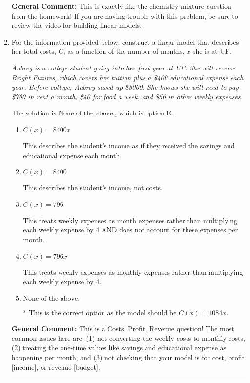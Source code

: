 \documentclass{extbook}[14pt]
\newcommand{\litem}[1]{\item #1

\rule{\textwidth}{0.4pt}}
\begin{document}
\begin{enumerate}
{\textbf{General Comment:} This is exactly like the chemistry mixture question from the homework! If you are having trouble with this problem, be sure to review the video for building linear models.
}
\litem{
For the information provided below, construct a linear model that describes her total costs, $C$, as a function of the number of months, $x$ she is at UF. 

\begin{center}
    \textit{ Aubrey is a college student going into her first year at UF. She will receive Bright Futures, which covers her tuition plus a \$400 educational expense each year. Before college, Aubrey saved up \$8000. She knows she will need to pay \$700 in rent a month, \$40 for food a week, and \$56 in other weekly expenses. }
\end{center}
The solution is \( \text{None of the above.} \), which is option E.\begin{enumerate}[label=\Alph*.]
\item \( C(x) = 8400 x \)

This describes the student's income as if they received the savings and educational expense each month.
\item \( C(x) = 8400 \)

This describes the student's income, not costs.
\item \( C(x) = 796 \)

This treats weekly expenses as month expenses rather than multiplying each weekly expense by 4 AND does not account for these expenses per month.
\item \( C(x) = 796 x \)

This treats weekly expenses as monthly expenses rather than multiplying each weekly expense by 4.
\item \( \text{None of the above.} \)

* This is the correct option as the model should be $C(x) = 1084 x$.
\end{enumerate}

\textbf{General Comment:} This is a Costs, Profit, Revenue question! The most common issues here are: (1) not converting the weekly costs to monthly costs, (2) treating the one-time values like savings and educational expense as happening per month, and (3) not checking that your model is for cost, profit [income], or revenue [budget].
}
\end{enumerate}
\end{document}
